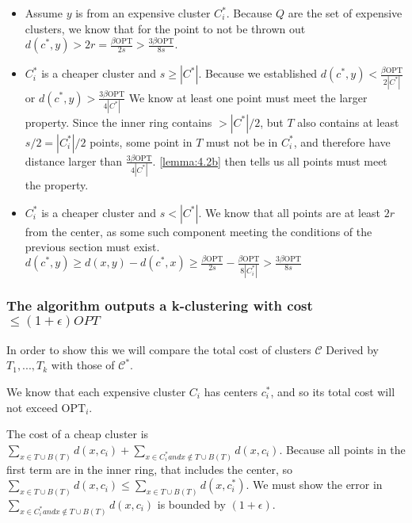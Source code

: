 \documentclass[paper=a4, fontsize=10.5pt]{scrartcl} %
\numberwithin{equation}{section} %
\numberwithin{figure}{section} %
\numberwithin{table}{section} %
\begin{document}
\begin{itemize}

\item Assume $y$ is from an expensive cluster $C^*_i$. Because $Q$ are the set of expensive clusters, we know that for the point to not be thrown out $d(c^*, y) > 2r = \frac{\beta\text{OPT}}{2s} > \frac{3\beta\text{OPT}}{8s}$.

\item $C^*_i$ is a cheaper cluster and $s \geq |C^*|$. Because we established $d(c^*, y) < \frac{\beta \text{OPT}}{2|C^*|}$ or $d(c^*, y) > \frac{3 \beta \text{OPT}}{4|C^*|}$ We know at least one point must meet the larger property. Since the inner ring contains $> |C^*|/2$, but $T$ also contains at least $s/2 = |C^*_i|/2$ points, some point in $T$ must not be in $C^*_i$, and therefore have distance larger than $\frac{3 \beta \text{OPT}}{4|C^*|}$. \ref{lemma:4.2b} then tells us all points must meet the property.

\item $C^*_i$ is a cheaper cluster and $s < |C^*|$. We know that all points are at least $2r$ from the center, as some such component meeting the conditions of the previous section must exist. $d(c^*, y) \geq d(x, y) - d(c^*, x) \geq \frac{\beta\text{OPT}}{2s} - \frac{\beta\text{OPT}}{8|C^*_i|} > \frac{3\beta\text{OPT}}{8s}$
\end{itemize}

\subsubsection{The algorithm outputs a k-clustering with cost $\leq (1+\epsilon)OPT$}

In order to show this we will compare the total cost of clusters $\mathcal{C}$ Derived by $T_1, ..., T_k$ with those of $\mathcal{C}^*$.

 We know that each expensive cluster $C_i$ has centers $c_i^*$, and so its total cost will not exceed $\text{OPT}_i$.

The cost of a cheap cluster is $\sum\limits_{x\in T\cup B(T)}d(x, c_i) + \sum\limits_{x \in C_i^* and x\notin T\cup B(T)}d(x, c_i)$. Because all points in the first term are in the inner ring, that includes the center, so $\sum\limits_{x\in T\cup B(T)}d(x, c_i) \leq \sum\limits_{x\in T\cup B(T)}d(x, c^*_i)$. We must show the error in $\sum\limits_{x \in C_i^* and x\notin T\cup B(T)}d(x, c_i)$ is bounded by $(1+\epsilon)$.
\end{document}
